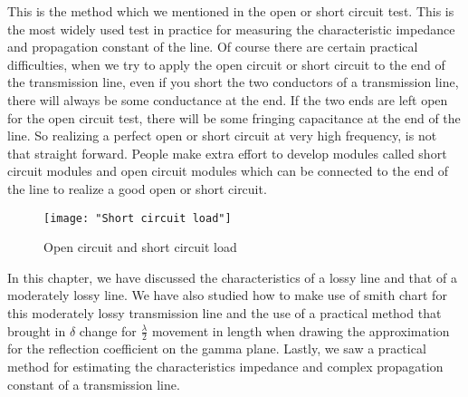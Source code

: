 This is the method which we mentioned in the open or short circuit test. This is the most widely used test in practice for measuring the characteristic impedance and propagation constant of the line. Of course there are certain practical difficulties, when we try to apply the open circuit or short circuit to the end of the transmission line, even if you short the two conductors of a transmission line, there will always be some conductance at the end. If the two ends are left open for the open circuit test, there will be some fringing capacitance at the end of the line. So realizing a perfect open or short circuit at very high frequency, is not that straight forward. People make extra effort to develop modules called short circuit modules and open circuit modules which can be connected to the end of the line to realize a good open or short circuit.
\begin{figure}[h]
	\centering
	\texttt{[image: "Short circuit load"]}
	\caption{Open circuit and short circuit load}
\end{figure}

In this chapter, we have discussed the characteristics of a lossy line and that of a moderately lossy line. We have also studied how to make use of smith chart for this moderately lossy transmission line and the use of a practical method that brought in $\delta$ change for $\frac{\lambda}{2}$ movement in length when drawing the approximation for the reflection coefficient on the gamma plane. Lastly, we saw a practical method for estimating the characteristics impedance and complex propagation constant of a transmission line.
